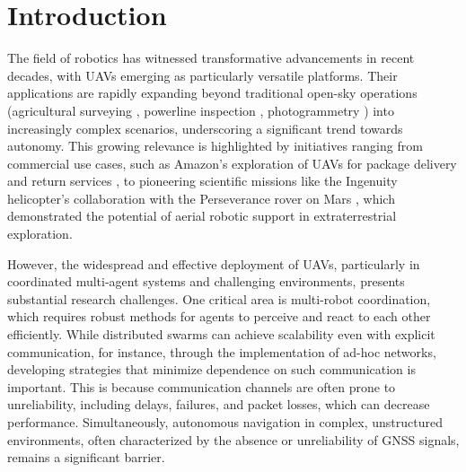 
\chapter{Introduction\label{chap:introduction}}
The field of robotics has witnessed transformative advancements in recent decades, with \ac{UAVs} emerging as particularly versatile platforms. 
Their applications are rapidly expanding beyond traditional open-sky operations (agricultural surveying \cite{agricultural_survey}, powerline inspection \cite{powerline_inspection}, photogrammetry \cite{photogrammetry}) into increasingly complex scenarios, underscoring a significant trend towards autonomy. 
This growing relevance is highlighted by initiatives ranging from commercial use cases, such as Amazon's exploration of \ac{UAV}s for package delivery and return services \cite{InsiderIntelligence_DroneDelivery}, to pioneering scientific missions like 
  the Ingenuity helicopter's collaboration with the Perseverance rover on Mars \cite{NASA_Ingenuity}, which demonstrated the potential of aerial robotic support in extraterrestrial exploration.

However, the widespread and effective deployment of \ac{UAV}s, particularly in coordinated multi-agent systems and challenging environments, presents substantial research challenges. 
One critical area is multi-robot coordination, which requires robust methods for agents to perceive and react to each other efficiently. 
While distributed swarms can achieve scalability even with explicit communication, for instance, through the implementation of ad-hoc networks, developing strategies that minimize dependence on such communication is important. 
This is because communication channels are often prone to unreliability, including delays, failures, and packet losses, which can decrease performance.
Simultaneously, autonomous navigation in complex, unstructured environments, often characterized by the absence or unreliability of \ac{GNSS} signals, remains a significant barrier.

